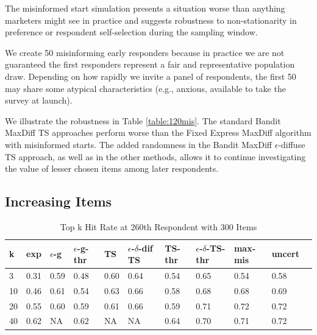 \documentclass[nonblindrev]{informs3}
\newcommand{\fixedexpressS}{\textbf{exp}}
\newcommand{\egreedyS}{$\epsilon$-\textbf{g}}
\newcommand{\egreedythresS}{$\epsilon$-\textbf{g-thr}}
\newcommand{\misminS}{\textbf{max-mis}}
\newcommand{\tsS}{\textbf{TS} }
\newcommand{\edtsS}{$\epsilon$-$\delta$-\textbf{dif TS} }
\newcommand{\tsthresS}{\textbf{TS-thr} }
\newcommand{\edtsthresS}{$\epsilon$-$\delta$-\textbf{TS-thr} }
\newcommand{\uncertS}{\textbf{uncert} }
\begin{document}
The misinformed start simulation presents a situation worse than anything marketers might see in practice and suggests robustness to non-stationarity in preference or respondent self-selection during the sampling window.

We create 50 misinforming early responders because in practice we are not guaranteed the first responders represent a fair and representative population draw. Depending on how rapidly we invite a panel of respondents, the first 50 may share some atypical characteristics (e.g., anxious, available to take the survey at launch).

We illustrate the robustness in Table \ref{table:120mis}. The standard Bandit MaxDiff TS approaches perform worse than the Fixed Express MaxDiff algorithm with misinformed starts. The added randomness in the Bandit MaxDiff $\epsilon$-diffuse TS approach, as well as in the other methods, allows it to continue investigating the value of lesser chosen items among later respondents.

\subsection{Increasing Items}
\begin{table}
\caption{Top k Hit Rate at 260th Respondent with 300 Items}
\begin{center}
\begin{tabular}{lllllllllll}
\hline   k &  \fixedexpressS & \egreedyS&\egreedythresS&\tsS&\edtsS&\tsthresS&\edtsthresS& \misminS& \uncertS \\ \hline 
3&   0.31 &   0.59 & 0.48 & 0.60 &  0.64 & 0.54 & 0.65 & 0.54 &   0.58 \\ 
10 & 0.46 &   0.61 & 0.54 & 0.63  & 0.66 & 0.58 & 0.68 & 0.68  &   0.69 \\ 
20 & 0.55 &   0.60 & 0.59 &  0.61 & 0.66 & 0.59 & 0.71 &       0.72 &   0.72\\ 
40 & 0.62 &   NA & 0.62 & NA &  NA & 0.64 & 0.70 & 0.71 & 0.72 \end{tabular}
\end{center}
\label{table:300at260}
\end{table}
\end{document}

